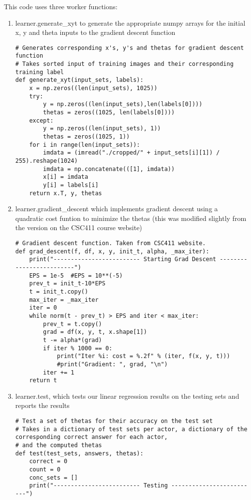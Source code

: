 \documentclass[11pt,a4paper]{report}
\begin{document}
This code uses three worker functions: 
\begin{enumerate}
\item learner.generate\_xyt to generate the appropriate numpy arrays for the initial x, y and theta inputs to the gradient descent function
\begin{lstlisting}
# Generates corresponding x's, y's and thetas for gradient descent function
# Takes sorted input of training images and their corresponding training label
def generate_xyt(input_sets, labels):
    x = np.zeros((len(input_sets), 1025))
    try:
        y = np.zeros((len(input_sets),len(labels[0])))
        thetas = zeros((1025, len(labels[0])))
    except:
        y = np.zeros((len(input_sets), 1))
        thetas = zeros((1025, 1))
    for i in range(len(input_sets)):
        imdata = (imread("./cropped/" + input_sets[i][1]) / 255).reshape(1024)
        imdata = np.concatenate(([1], imdata))
        x[i] = imdata
        y[i] = labels[i]
    return x.T, y, thetas
\end{lstlisting}
\item learner.gradient\_descent which implements gradient descent using a quadratic cost funtion to minimize the thetas (this was modified slightly from the version on the CSC411 course website)
\begin{lstlisting}
# Gradient descent function. Taken from CSC411 website.
def grad_descent(f, df, x, y, init_t, alpha, _max_iter):
    print("------------------------- Starting Grad Descent -------------------------")
    EPS = 1e-5  #EPS = 10**(-5)
    prev_t = init_t-10*EPS
    t = init_t.copy()
    max_iter = _max_iter
    iter = 0
    while norm(t - prev_t) > EPS and iter < max_iter:
        prev_t = t.copy()
        grad = df(x, y, t, x.shape[1])
        t -= alpha*(grad)
        if iter % 1000 == 0:
            print("Iter %i: cost = %.2f" % (iter, f(x, y, t)))
            #print("Gradient: ", grad, "\n")
        iter += 1
    return t
\end{lstlisting}
\item learner.test, which tests our linear regression results on the testing sets and reports the results
\begin{lstlisting}
# Test a set of thetas for their accuracy on the test set
# Takes in a dictionary of test sets per actor, a dictionary of the corresponding correct answer for each actor,
# and the computed thetas
def test(test_sets, answers, thetas):
    correct = 0
    count = 0
    conc_sets = []
    print("------------------------- Testing -------------------------")

\end{lstlisting}
\end{enumerate}
\end{document}
